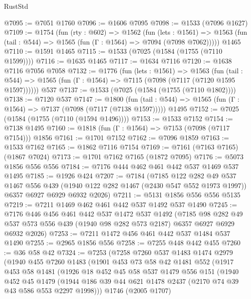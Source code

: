 \begin{lexlean}{RustStd}
\begin{coremodule}
@7095 := @7051 @1760
@7096 := @1606 @7095
@7098 := @1533 (@7096 @1627)
@7109 := @1754
    (fun (rty : @602) =>
    @1562
      (fun (lets : @1561) =>
      @1563 (fun (tail : @544) => @1565 (fun (Γ : @1564) => @7094 (@7098 @7062)))))
    @1465
@7110 := @1591 @1465
@7115 := @1533 (@7025 (@1584 (@1755 (@7110 @1599))))
@7116 := @1635 @1465
@7117 := @1634 @7116
@7120 := @1638 @7116 @7056 @7058
@7132 := @1776
    (fun (lets : @1561) =>
    @1563
      (fun (tail : @544) => @1565 (fun (Γ : @1564) => @7115 (@7098 (@7117 (@7120 @1595 @1597))))))
    @537
@7137 := @1533 (@7025 (@1584 (@1755 (@7110 @1802))))
@7138 := @7120 @537
@7147 := @1800
    (fun (tail : @544) => @1565 (fun (Γ : @1564) => @7137 (@7098 (@7117 (@7138 @1597)))))
    @1495
@7152 := @7025 (@1584 (@1755 (@7110 (@1594 @1496))))
@7153 := @1533 @7152
@7154 := @7138 @1495
@7160 := @1818 (fun (Γ : @1564) => @7153 (@7098 (@7117 @7154))) @1856
@7161 := @1701 @7152
@7162 := @7096 @1859
@7163 := @1533 @7162
@7165 := @1862 @7116 @7154
@7169 := @7161 (@7163 @7165) (@1867 @7024)
@7173 := @1701 @7162 @7165 (@1872 @7095)
@7176 := @5073 @1856 @556 @556
@7184 := @7176 @444 @462 @461 @442 @537 @1469 @537 @1495
@7185 := @1926 @424
@7207 := @7184
    (@7185
      @122
      @282
      @49
      @537
      @1467
      @556
      @439
      (@1940 @122 @282 @1467 (@2430 @547 @552 @1973 @1997))
      @6357
      @6927
      @6929
      @6932
      @2026)
@7211 := @5131 @1856 @556 @556 @5135
@7219 := @7211 @1469 @462 @461 @442 @537 @1492 @537 @1490
@7245 := @7176
    @446
    @456
    @461
    @442
    @537
    @1472
    @537
    @1492
    (@7185
      @98
      @282
      @49
      @537
      @573
      @556
      @439
      (@1940 @98 @282 @573 @2187)
      @6357
      @6927
      @6929
      @6932
      @2026)
@7253 := @7211 @1472 @456 @461 @442 @537 @1484 @537 @1490
@7255 := @2965 @1856 @556
@7258 := @7255 @448 @442 @455
@7260 := @36 @58 @42
@7324 := @7253
    (@7258
      @7260
      @537
      @1483
      @1474
      @2979
      (@1940
        @455
        @7260
        @1483
        (@1901
          @453
          @73
          @58
          @42
          @1481
          @552
          (@1917
            @453
            @58
            @1481
            (@1926
              @18
              @452
              @45
              @58
              @537
              @1479
              @556
              @151
              (@1940
                @452
                @45
                @1479
                (@1944 @186 @39 @44 @621 @1478 @2437 (@2170 @74 @39 @43 @586 @553 @2297 @1998)))
              @1746
              (@2005 @1707)

\end{coremodule}
\end{lexlean}
